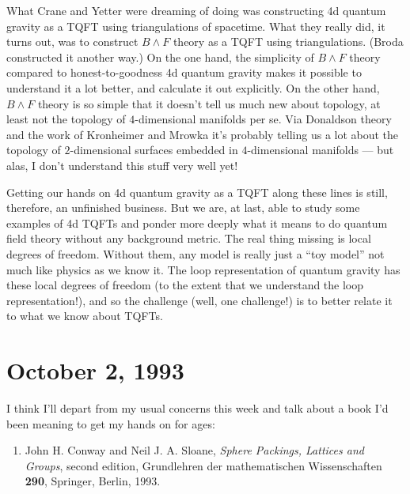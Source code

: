 \documentclass{article}
\def\tightlist{}
\begin{document}
What Crane and Yetter were dreaming of doing was constructing 4d quantum
gravity as a TQFT using triangulations of spacetime. What they really
did, it turns out, was to construct \(B\wedge F\) theory as a TQFT using
triangulations. (Broda constructed it another way.) On the one hand, the
simplicity of \(B\wedge F\) theory compared to honest-to-goodness 4d
quantum gravity makes it possible to understand it a lot better, and
calculate it out explicitly. On the other hand, \(B\wedge F\) theory is
so simple that it doesn't tell us much new about topology, at least not
the topology of \(4\)-dimensional manifolds per se. Via Donaldson theory
and the work of Kronheimer and Mrowka it's probably telling us a lot
about the topology of \(2\)-dimensional surfaces embedded in
\(4\)-dimensional manifolds --- but alas, I don't understand this stuff
very well yet!

Getting our hands on 4d quantum gravity as a TQFT along these lines is
still, therefore, an unfinished business. But we are, at last, able to
study some examples of 4d TQFTs and ponder more deeply what it means to
do quantum field theory without any background metric. The real thing
missing is local degrees of freedom. Without them, any model is really
just a ``toy model'' not much like physics as we know it. The loop
representation of quantum gravity has these local degrees of freedom (to
the extent that we understand the loop representation!), and so the
challenge (well, one challenge!) is to better relate it to what we know
about TQFTs.



\hypertarget{week20}{%
\section{October 2, 1993}\label{week20}}

I think I'll depart from my usual concerns this week and talk about a
book I'd been meaning to get my hands on for ages:

\begin{enumerate}
\def\labelenumi{\arabic{enumi})}
\tightlist
\item
  John H. Conway and Neil J. A. Sloane, \emph{Sphere Packings, Lattices
  and Groups}, second edition, Grundlehren der mathematischen
  Wissenschaften \textbf{290}, Springer, Berlin, 1993.
\end{enumerate}
\end{document}
